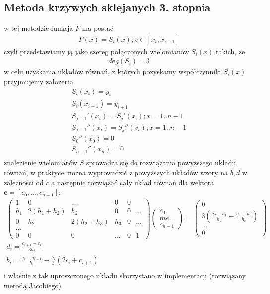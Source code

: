 \documentclass{article}
\begin{document}
\subsection{Metoda krzywych sklejanych 3. stopnia}
w tej metodzie funkcja $F$ ma postać
\begin{gather*}
	F(x) = S_i(x); x\in [x_i, x_{i+1}]
\end{gather*}
czyli przedstawiamy ją jako szereg połączonych wielomianów $S_i(x)$ takich, że
\begin{gather*}
	deg (S_i) = 3
\end{gather*}
w celu uzyskania układów równań, z których pozyskamy współczynniki $S_i(x)$ przyjmujemy założenia
\begin{gather*}
	S_i(x_i) = y_i \\
	S_i(x_{i+1}) = y_{i+1} \\
	S_{j-1}'(x_i) = S_{j}'(x_i); x = 1..n-1 \\
	S_{j-1}''(x_i) = S_{j}''(x_i); x = 1..n-1 \\
	S_0''(x_0) = 0 \\
	S_{n-1}'' (x_n) = 0 \\
\end{gather*}
znalezienie wielomianów $S$ sprowadza się do rozwiązania powyższego układu równań, w praktyce można wyprowadzić z powyższych układów
wzory na $b,d$ w zależności od $c$ a następnie rozwiązać cały układ równań dla wektora $\textbf{c} = [c_0, ..., c_{n-1}]$:
\begin{gather*}
	\begin{pmatrix}
	1 & 0  & ...  & 0 & 0 \\
	h_1 & 2(h_1 + h_2) & h_2 & 0  & 0 & ... \\
	0 & h_2 & 2(h_2 + h_3) & h_3 & 0 & ... \\
	... \\
	0  & 0 & 0 & ... & 0 & 1
	\end{pmatrix} 
	\begin{pmatrix}
	c_0 \\me
	... \\
	c_{n-1}
	\end{pmatrix}
	= \begin{pmatrix}
		0 \\ 3(\frac{a_2 - a_1}{h_2} - \frac{a_1 - a_0}{h_0}) \\ ... \\ 0
	\end{pmatrix}\\
	d_i = \frac{c_{i+1} - c_i}{3h_i} \\
	b_i = \frac{a_i - a_{i-1}}{h_i} - \frac{h_i}{3}(2c_i + c_{i+1}) \\
\end{gather*}
i właśnie z tak uproszczonego układu skorzystano w implementacji (rozwiązany metodą Jacobiego)
\end{document}
